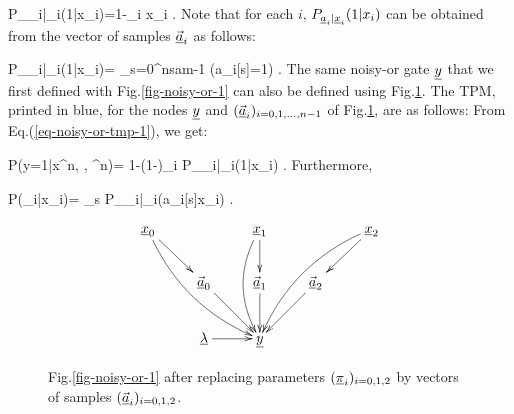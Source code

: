 \beq
P_{\rva_i|\rvx_i}(1|x_i)=1-\pi_i x_i
\;.
\eeq
Note that for each $i$,
$P_{{\underline{a}}_i|{\underline{x}}_i}(1|x_i)$
can be 
obtained
from the vector of samples
$\vec{{\underline{a}}}_i$ 
as follows:


\beq
P_{\rva_i|\rvx_i}(1|x_i)=
\sum_{s=0}^{nsam-1} \indi(a_i[s]=1)
\;.
\eeq
The same noisy-or gate ${\underline{y}}$
that we first defined with
Fig.\ref{fig-noisy-or-1}
can also be defined using
Fig.\ref{fig-noisy-or-2}.
The TPM, printed in blue,
for  
the nodes ${\underline{y}}$
and $(\vec{{\underline{a}}}_i)_{i=0,1,\ldots, n-1}$
of Fig.\ref{fig-noisy-or-2}, are  as follows:
From Eq.(\ref{eq-noisy-or-tmp-1}),
we get:

\beq\color{blue}
P(y=1|x^n, \lam, \veca^n)=
1-(1-\lam)\prod_i P_{\rva_i|\rvx_i}(1|x_i)
\;.
\eeq
Furthermore, 

\beq\color{blue}
P(\veca_i|x_i)=
\prod_s P_{\rva_i|\rvx_i}(a_i[s]\cond x_i)
\;.
\eeq

\begin{figure}[h!]
$$\xymatrix{
\rvx_0\ar[dr]\ar@/_1pc/[ddrr]
&&\rvx_1\ar[d]\ar@/_1pc/[dd]
&&\rvx_2\ar@/_1pc/[ddll]\ar[dl]
\\
&\vec{\rva}_0\ar[dr]
&\vec{\rva}_1\ar[d]
&\vec{\rva}_2\ar[dl]
\\
&\ul{\lam}\ar[r]
&\rvy
}$$
\caption{ Fig.\ref{fig-noisy-or-1}
after replacing parameters 
$(\underline{\pi}_i)_{i=0,1,2}$
by 
vectors 
of samples $(\vec{{\underline{a}}}_i)_{i=0,1,2}$.}
\label{fig-noisy-or-2}
\end{figure}
